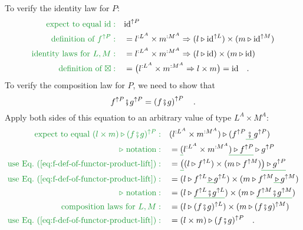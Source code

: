 To verify the identity law for $P$:
\begin{align*}
{\color{greenunder}\text{expect to equal }\text{id}:}\quad & \text{id}^{\uparrow P}\\
{\color{greenunder}\text{definition of }f^{\uparrow P}:}\quad & =l^{:L^{A}}\times m^{:M^{A}}\Rightarrow(l\triangleright\text{id}^{\uparrow L})\times(m\triangleright\text{id}^{\uparrow M})\\
{\color{greenunder}\text{identity laws for }L,M:}\quad & =l^{:L^{A}}\times m^{:M^{A}}\Rightarrow(l\triangleright\text{id})\times(m\triangleright\text{id})\\
{\color{greenunder}\text{definition of }\boxtimes:}\quad & =\big(l^{:L^{A}}\times m^{:M^{A}}\Rightarrow l\times m\big)=\text{id}\quad.
\end{align*}
To verify the composition law for $P$, we need to show that
\[
f^{\uparrow P}\bef g^{\uparrow P}=\left(f\bef g\right)^{\uparrow P}\quad.
\]
Apply both sides of this equation to an arbitrary value of type $L^{A}\times M^{A}$:
\begin{align*}
{\color{greenunder}\text{expect to equal }(l\times m)\triangleright(f\bef g)^{\uparrow P}:}\quad & (l^{:L^{A}}\times m^{:M^{A}})\triangleright(f^{\uparrow P}\gunderline{\,\bef\,}g^{\uparrow P})\\
{\color{greenunder}\triangleright\text{ notation}:}\quad & =\gunderline (l^{:L^{A}}\times m^{:M^{A}}\gunderline{)\triangleright f^{\uparrow P}}\triangleright g^{\uparrow P}\\
{\color{greenunder}\text{use Eq.~(\ref{eq:f-def-of-functor-product-lift})}:}\quad & =\gunderline{\big(}(l\triangleright f^{\uparrow L})\times(m\triangleright f^{\uparrow M})\gunderline{\big)\triangleright g^{\uparrow P}}\\
{\color{greenunder}\text{use Eq.~(\ref{eq:f-def-of-functor-product-lift})}:}\quad & =(l\triangleright f^{\uparrow L}\gunderline{\,\triangleright\,}g^{\uparrow L})\times(m\triangleright f^{\uparrow M}\gunderline{\,\triangleright\,}g^{\uparrow M})\\
{\color{greenunder}\triangleright\text{ notation}:}\quad & =(l\triangleright\gunderline{f^{\uparrow L}\bef g^{\uparrow L}})\times(m\triangleright\gunderline{f^{\uparrow M}\bef g^{\uparrow M}})\\
{\color{greenunder}\text{composition laws for }L,M:}\quad & =(l\triangleright(f\bef g)^{\uparrow L})\times(m\triangleright(f\bef g)^{\uparrow M})\\
{\color{greenunder}\text{use Eq.~(\ref{eq:f-def-of-functor-product-lift})}:}\quad & =(l\times m)\triangleright(f\bef g)^{\uparrow P}\quad.
\end{align*}
